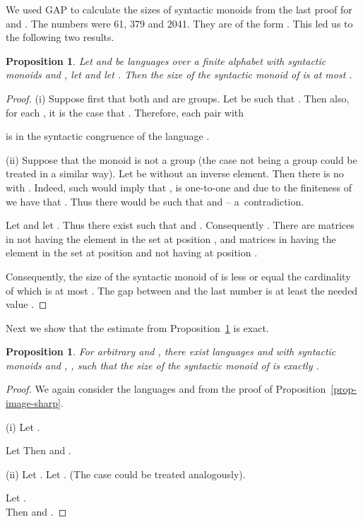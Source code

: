 \documentclass[copyright]{eptcs}
\newcounter{theorem}
\newtheorem{proposition}[theorem]{Proposition}
\theoremstyle{definition}
\begin{document}
We used GAP to calculate the sizes of syntactic monoids from the last
proof for  and . The numbers were
61, 379 and 2041. They are of the form . This led us
to the following two results.

\begin{proposition}\label{prop-groups+}
Let  and  be languages over a finite alphabet  
with syntactic monoids  and ,
let  and let .
Then the size of the syntactic monoid of 
is at most .
\end{proposition}
 
\begin{proof}
(i) Suppose first that both  and  are groups.
Let  be such that .
Then also, for each , it is the case that  
.
Therefore, each pair  with

is in the syntactic congruence of the language .
\smallskip

(ii) Suppose that the monoid  is not a group (the case  not being
a group could be treated in a similar way).
Let  be without an inverse element.  Then there is no  
with . Indeed, such  would imply that , 
is one-to-one
and due to the finiteness of  we have that . 
Thus there would
be  such that  and  -- a~contradiction.

Let  and let . Thus there exist
 such that  and .
Consequently
.
There are  matrices in  not having the element
 in the set at position , and 
 matrices in  having the element
 in the set at position  and not having  at position .

Consequently, the size of the syntactic monoid of  is less
or equal the cardinality of  which is at most
. The gap between  and the last number
is at least the needed value .
\end{proof}

Next we show that the estimate from Proposition~\ref{prop-groups+} is exact.

\begin{proposition}\label{prop-synt-monoids-sharp}
For arbitrary  and , there exist languages  and  with
syntactic monoids  and , , such that
the size of the syntactic monoid of 
is exactly .
\end{proposition}
 
\begin{proof}
We again consider the languages  and  from the proof of 
Proposition~\ref{prop-image-sharp}.

(i) Let .

Let 
Then  and .

\medskip
(ii) Let .
Let .
(The case   could be treated
analogously).

Let .\\
Then  and .
\end{proof}
\end{document}
